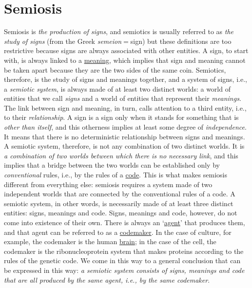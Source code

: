 \documentclass[12pt]{article}
\begin{document}
\section{Semiosis}
Semiosis is \textit{the production of signs}, and semiotics is usually referred to as \textit{the study of signs} (from the Greek \textit{semeion}$=$sign) but these definitions are too restrictive because signs are always associated with other entities. A sign, to start with, is always linked to a \hyperlink{meaning}{meaning}, which implies that sign and meaning cannot be taken apart because they are the two sides of the same coin. Semiotics, therefore, is the study of signs and meanings together, and a system of signs, i.e., a \textit{semiotic system}, is always made of at least two distinct worlds: a world of entities that we call \textit{signs} and a world of entities that represent their \textit{meanings}. The link between sign and meaning, in turn, calls attention to a third entity, i.e., to their \textit{relationship}. A sign is a sign only when it stands for something that is \textit{other than itself}, and this otherness implies at least some degree of \textit{independence}. It means that there is no deterministic relationship between signs and meanings. A semiotic system, therefore, is not any combination of two distinct worlds. It is \textit{a combination of two worlds between which there is no necessary link}, and this implies that a bridge between the two worlds can be established only by \textit{conventional} rules, i.e., by the rules of a \hyperlink{code}{code}. This is what makes semiosis different from everything else: semiosis requires a system made of two independent worlds that are connected by the conventional rules of a code. A semiotic system, in other words, is necessarily made of at least three distinct entities: signs, meanings and code. Signs, meanings and code, however, do not come into existence of their own. There is always an `\hyperlink{agent}{agent}' that produces them, and that agent can be referred to as a \hyperlink{codemakers}{codemaker}. In the case of culture, for example, the codemaker is the human \hyperlink{brain}{brain}; in the case of the cell, the codemaker is the ribonucleoprotein system that makes proteins according to the rules of the genetic code. We come in this way to a general conclusion that can be expressed in this way: \textit{a semiotic system consists of signs, meanings and code that are all produced by the same agent, i.e., by the same codemaker}.


\hypertarget{semiotic_dynamics}{}
\end{document}
